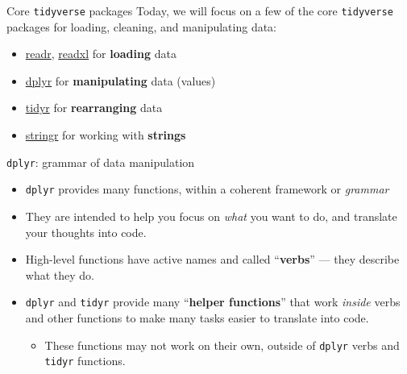 \documentclass[
  11pt,
  ignorenonframetext,
]{beamer}
\providecommand{\tightlist}{%
  \setlength{\itemsep}{0pt}\setlength{\parskip}{0pt}}
\begin{document}
\begin{frame}[fragile]{Core \texttt{tidyverse} packages}
\protect\hypertarget{core-tidyverse-packages}{}
Today, we will focus on a few of the core \texttt{tidyverse} packages
for loading, cleaning, and manipulating data:

\begin{itemize}
\tightlist
\item
  \href{https://readr.tidyverse.org/}{readr},
  \href{https://readxl.tidyverse.org/}{readxl} for \textbf{loading} data
\item
  \href{https://dplyr.tidyverse.org/}{dplyr} for \textbf{manipulating}
  data (values)
\item
  \href{https://tidyr.tidyverse.org/}{tidyr} for \textbf{rearranging}
  data
\item
  \href{https://stringr.tidyverse.org/}{stringr} for working with
  \textbf{strings}
\end{itemize}
\end{frame}

\begin{frame}[fragile]{\texttt{dplyr}: grammar of data manipulation}
\protect\hypertarget{dplyr-grammar-of-data-manipulation}{}
\begin{itemize}
\item
  \texttt{dplyr} provides many functions, within a coherent framework or
  \emph{grammar}
\item
  They are intended to help you focus on \emph{what} you want to do, and
  translate your thoughts into code.
\item
  High-level functions have active names and called ``\textbf{verbs}''
  --- they describe what they do.
\item
  \texttt{dplyr} and \texttt{tidyr} provide many ``\textbf{helper
  functions}'' that work \emph{inside} verbs and other functions to make
  many tasks easier to translate into code.

  \begin{itemize}
  \tightlist
  \item
    These functions may not work on their own, outside of \texttt{dplyr}
    verbs and \texttt{tidyr} functions.
  \end{itemize}
\end{itemize}
\end{frame}
\end{document}
